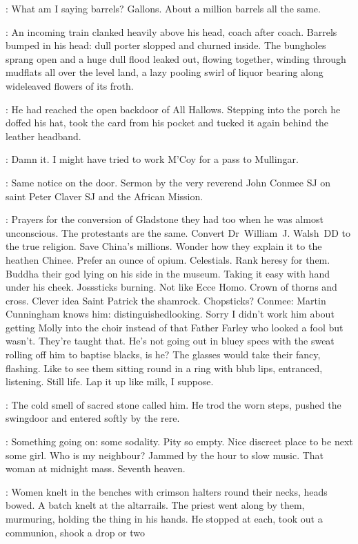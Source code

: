 \BloomInt:
What am I saying barrels?
Gallons.
About a million barrels all the same.

:
An incoming train clanked heavily above his head, coach after coach.
Barrels bumped in his head:
dull porter slopped and churned inside.
The bungholes sprang open and a huge dull flood leaked out,
flowing together,
winding through mudflats all over the level land,
a lazy pooling swirl of liquor
bearing along wideleaved flowers of its froth.

:
He had reached the open backdoor of All Hallows.
Stepping into the porch
he doffed his hat,
took the card from his pocket
and tucked it again behind the leather headband.

\BloomInt:
Damn it.
I might have tried to work M'Coy for a pass to Mullingar.

:
Same notice on the door.
Sermon by the very reverend John Conmee SJ
on saint Peter Claver SJ and the African Mission.

\BloomInt:
Prayers for the conversion of Gladstone they had too
when he was almost unconscious.
The protestants are the same.
Convert Dr~William~J. Walsh~DD to the true religion.
Save China's millions.
Wonder how they explain it to the heathen Chinee.
Prefer an ounce of opium.
Celestials.
Rank heresy for them.
Buddha their god lying on his side in the museum.
Taking it easy
with hand under his cheek.
Josssticks burning.
Not like Ecce Homo.
Crown of thorns and cross.
Clever idea
Saint Patrick the shamrock.
Chopsticks?
Conmee:
Martin Cunningham knows him:
distinguishedlooking.
Sorry I didn't work him about getting Molly into the choir
instead of that Father Farley who looked a fool but wasn't.
They're taught that.
He's not going out in bluey specs
with the sweat rolling off him to baptise blacks,
is he?
The glasses would take their fancy, flashing.
Like to see them sitting round in a ring with blub lips,
entranced, listening.
Still life.
Lap it up like milk, I suppose.

:
The cold smell of sacred stone called him.
He trod the worn steps,
pushed the swingdoor
and entered softly by the rere.

\BloomInt:
Something going on: some sodality.
Pity so empty.
Nice discreet place to be next some girl.
Who is my neighbour?
Jammed by the hour to slow music.
That woman at midnight mass.
Seventh heaven.

:
Women knelt in the benches with crimson halters round their necks,
heads bowed.
A batch knelt at the altarrails.
The priest went along by them, murmuring,
holding the thing in his hands.
He stopped at each, took out a communion,
shook a drop or two

